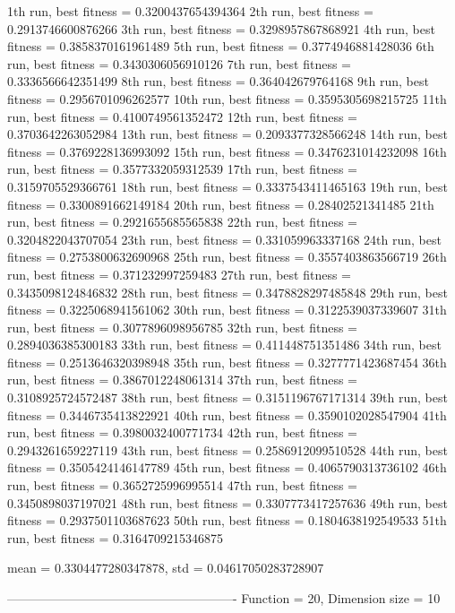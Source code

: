 1th run, best fitness = 0.3200437654394364
2th run, best fitness = 0.2913746600876266
3th run, best fitness = 0.3298957867868921
4th run, best fitness = 0.3858370161961489
5th run, best fitness = 0.3774946881428036
6th run, best fitness = 0.3430306056910126
7th run, best fitness = 0.3336566642351499
8th run, best fitness = 0.364042679764168
9th run, best fitness = 0.2956701096262577
10th run, best fitness = 0.3595305698215725
11th run, best fitness = 0.4100749561352472
12th run, best fitness = 0.3703642263052984
13th run, best fitness = 0.2093377328566248
14th run, best fitness = 0.3769228136993092
15th run, best fitness = 0.3476231014232098
16th run, best fitness = 0.3577332059312539
17th run, best fitness = 0.3159705529366761
18th run, best fitness = 0.3337543411465163
19th run, best fitness = 0.3300891662149184
20th run, best fitness = 0.28402521341485
21th run, best fitness = 0.2921655685565838
22th run, best fitness = 0.3204822043707054
23th run, best fitness = 0.331059963337168
24th run, best fitness = 0.2753800632690968
25th run, best fitness = 0.3557403863566719
26th run, best fitness = 0.371232997259483
27th run, best fitness = 0.3435098124846832
28th run, best fitness = 0.3478828297485848
29th run, best fitness = 0.3225068941561062
30th run, best fitness = 0.3122539037339607
31th run, best fitness = 0.3077896098956785
32th run, best fitness = 0.2894036385300183
33th run, best fitness = 0.411448751351486
34th run, best fitness = 0.2513646320398948
35th run, best fitness = 0.3277771423687454
36th run, best fitness = 0.3867012248061314
37th run, best fitness = 0.3108925724572487
38th run, best fitness = 0.3151196767171314
39th run, best fitness = 0.3446735413822921
40th run, best fitness = 0.3590102028547904
41th run, best fitness = 0.3980032400771734
42th run, best fitness = 0.2943261659227119
43th run, best fitness = 0.2586912099510528
44th run, best fitness = 0.3505424146147789
45th run, best fitness = 0.4065790313736102
46th run, best fitness = 0.3652725996995514
47th run, best fitness = 0.3450898037197021
48th run, best fitness = 0.3307773417257636
49th run, best fitness = 0.2937501103687623
50th run, best fitness = 0.1804638192549533
51th run, best fitness = 0.3164709215346875

mean = 0.3304477280347878, std = 0.04617050283728907

-------------------------------------------------------
Function = 20, Dimension size = 10


